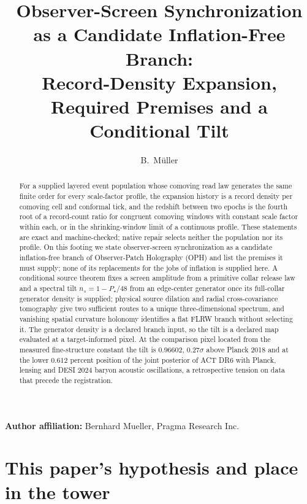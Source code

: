 \documentclass[11pt]{article}
\title{Observer-Screen Synchronization as a Candidate Inflation-Free Branch:\\
Record-Density Expansion, Required Premises and a Conditional Tilt}
\author{B.\ M\"uller}
\date{\OPHPaperReleaseDate}
\theoremstyle{remark}
\theoremstyle{plain}
\begin{document}
\maketitle
\OPHPaperReleaseBanner

\begin{center}
\small\textbf{Author affiliation:} Bernhard Mueller, Pragma Research Inc.
\end{center}

\begin{abstract}
For a supplied layered event population whose comoving read law generates
the same finite order for every scale-factor profile, the expansion history
is a record density per comoving cell and conformal tick, and the redshift
between two epochs is the fourth root of a record-count ratio for congruent
comoving windows with constant scale factor within each, or in the
shrinking-window limit of a continuous profile. These statements are exact
and machine-checked; native repair selects neither the population nor its
profile. On this footing we state observer-screen synchronization as a candidate
inflation-free branch of Observer-Patch Holography (OPH) and list the premises
it must supply; none of its replacements for the jobs of inflation is
supplied here. A conditional source theorem fixes a screen amplitude from a primitive collar
release law and a spectral tilt \(n_s=1-P_\star/48\) from an edge-center
generator once its full-collar generator density is supplied; physical
source dilation and radial cross-covariance tomography give two sufficient
routes to a unique three-dimensional spectrum, and vanishing spatial
curvature holonomy identifies a flat FLRW branch without selecting it. The
generator density is a declared branch input, so the tilt is a declared map
evaluated at a target-informed pixel. At the comparison pixel
located from the measured fine-structure constant the tilt is \(0.96602\),
\(0.27\sigma\) above Planck 2018 and at the lower \(0.612\) percent position
of the joint posterior of ACT DR6 with Planck, lensing and DESI 2024 baryon
acoustic oscillations, a retrospective tension on data that precede the
registration.
\end{abstract}





\section*{This paper's hypothesis and place in the tower}
\end{document}
